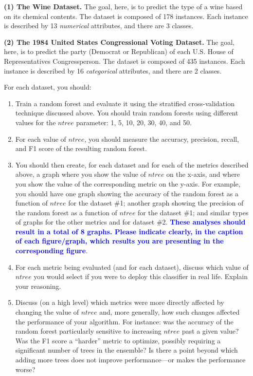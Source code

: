 \documentclass[letterpaper]{article}
\newcommand{\HIGHLIGHT}[1]{\textcolor{blue}{\textbf{#1}}}
\begin{document}
\textbf{(1) The Wine Dataset.}
The goal, here, is to predict the type of a wine based on its chemical contents. The dataset is composed of 178 instances. Each instance is described by 13 \textit{numerical} attributes, and there are 3 classes.

\textbf{(2) The 1984 United States Congressional Voting Dataset.}
The goal, here, is to predict the party (Democrat or Republican) of each U.S. House of Representatives Congressperson. The dataset is composed of 435 instances. Each instance is described by 16 \textit{categorical} attributes, and there are 2 classes.


For each dataset, you should:

\begin{enumerate}
    \item Train a random forest and evaluate it using the stratified cross-validation technique discussed above. You should train random forests using different values for the $ntree$ parameter: 1, 5, 10, 20, 30, 40, and 50.
    \item For each value of $ntree$, you should measure the accuracy, precision, recall, and F1 score of the resulting random forest. 
    \item You should then create, for each dataset and for each of the metrics described above, a graph where you show the value of $ntree$ on the x-axis, and where you show the value of the corresponding metric on the y-axis. For example, you should have one graph showing the accuracy of the random forest as a function of $ntree$ for the dataset \#1; another graph showing the precision of the random forest as a function of $ntree$ for the dataset \#1; and similar types of graphs for the other metrics and for dataset \#2. \HIGHLIGHT{These analyses should result in a total of 8 graphs. Please indicate clearly, in the caption of each figure/graph, which results you are presenting in the corresponding figure}.
    \item For each metric being evaluated (and for each dataset), discuss which value of $ntree$ you would select if you were to deploy this classifier in real life. Explain your reasoning. 
    \item Discuss (on a high level) which metrics were more directly affected by changing the value of $ntree$ and, more generally, how such changes affected the performance of your algorithm. For instance: was the accuracy of the random forest particularly sensitive to increasing $ntree$ past a given value? Was the F1 score a  ``harder'' metric to optimize, possibly requiring a significant number of trees in the ensemble? Is there a point beyond which adding more trees does not improve performance---or makes the performance worse?
\end{enumerate}
\end{document}
